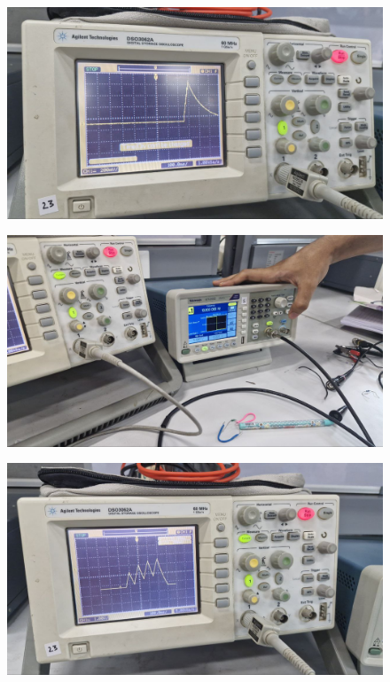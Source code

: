 \documentclass[a4paper,12pt]{article}
\begin{document}
\begin{figure}[h!]
   \centering
   \includegraphics[width=0.7\linewidth]{fig/Figure_5.jpg}
\end{figure}
\begin{figure}[h!]
   \centering
   \includegraphics[width=0.7\linewidth]{fig/Figure_6.jpg}
\end{figure}
\begin{figure}[h!]
   \centering
   \includegraphics[width=0.7\linewidth]{fig/Figure_7.jpg}
\end{figure}
\end{document}
